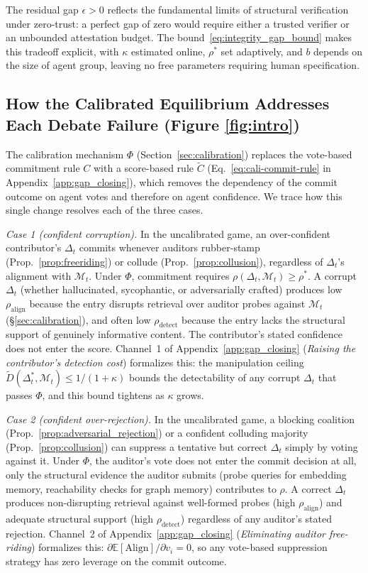 \noindent The residual gap $\epsilon > 0$ reflects the fundamental
limits of structural verification under zero-trust: a perfect gap of
zero would require either a trusted verifier or an unbounded
attestation budget. The bound~\eqref{eq:integrity_gap_bound} makes
this tradeoff explicit, with $\kappa$ estimated online, $\rho^*$ set
adaptively, and $b$ depends on the size of agent group, leaving no free parameters
requiring human specification.


\subsection{How the Calibrated Equilibrium Addresses Each Debate Failure (Figure \ref{fig:intro})}
\label{app:cal-equi-adress-mad-failure}

The calibration mechanism $\Phi$ (Section~\ref{sec:calibration}) replaces the vote-based commitment rule $C$ with a score-based rule $\tilde{C}$ (Eq.~\ref{eq:cali-commit-rule} in Appendix~\ref{app:gap_closing}), which removes the dependency of the commit outcome on agent votes and therefore on agent confidence. We trace how this single change resolves each of the three cases.

\emph{Case 1 (confident corruption).} In the uncalibrated game, an over-confident contributor's $\Delta_t$ commits whenever auditors rubber-stamp (Prop.~\ref{prop:freeriding}) or collude (Prop.~\ref{prop:collusion}), regardless of $\Delta_t$'s alignment with $\mathcal{M}_t$. Under $\Phi$, commitment requires $\rho(\Delta_t, \mathcal{M}_t) \geq \rho^*$. A corrupt $\Delta_t$ (whether hallucinated, sycophantic, or adversarially crafted) produces low $\rho_{\mathrm{align}}$ because the entry disrupts retrieval over auditor probes against $\mathcal{M}_t$ (\S\ref{sec:calibration}), and often low $\rho_{\mathrm{detect}}$ because the entry lacks the structural support of genuinely informative content. The contributor's stated confidence does not enter the score. Channel~1 of Appendix~\ref{app:gap_closing} (\emph{Raising the contributor's detection cost}) formalizes this: the manipulation ceiling $\tilde{D}(\Delta_t^*, \mathcal{M}_t) \leq 1/(1+\kappa)$ bounds the detectability of any corrupt $\Delta_t$ that passes $\Phi$, and this bound tightens as $\kappa$ grows.

\emph{Case 2 (confident over-rejection).} In the uncalibrated game, a blocking coalition (Prop.~\ref{prop:adversarial_rejection}) or a confident colluding majority (Prop.~\ref{prop:collusion}) can suppress a tentative but correct $\Delta_t$ simply by voting against it. Under $\Phi$, the auditor's vote does not enter the commit decision at all, only the structural evidence the auditor submits (probe queries for embedding memory, reachability checks for graph memory) contributes to $\rho$. A correct $\Delta_t$ produces non-disrupting retrieval against well-formed probes (high $\rho_{\mathrm{align}}$) and adequate structural support (high $\rho_{\mathrm{detect}}$) regardless of any auditor's stated rejection. Channel~2 of Appendix~\ref{app:gap_closing} (\emph{Eliminating auditor free-riding}) formalizes this: $\partial \mathbb{E}[\mathrm{Align}]/\partial v_i = 0$, so any vote-based suppression strategy has zero leverage on the commit outcome.

